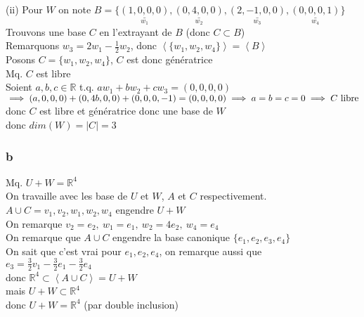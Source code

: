 \documentclass[11pt]{exam}
\newcommand{\R}{\mathbb{R}}
\newcommand{\0}{\mathbb{0}}
\begin{document}
(ii) Pour $W$ on note $B = \{\underset{w_1}{\underline{(1,0,0,0)}},\underset{w_2}{\underline{(0,4,0,0)}},\underset{w_3}{\underline{(2,-1,0,0)}},\underset{w_4}{\underline{(0,0,0,1)}}\}$\\
Trouvons une base $C$ en l'extrayant de $B$ (donc $C \subset B$)\\
Remarquons $w_3 = 2w_1-\frac{1}{2}w_2$, donc $\left<\{w_1, w_2, w_4\}\right> = \left<B\right>$\\
Posons $C = \{w_1, w_2, w_4\}$, $C$ est donc génératrice\\
Mq. $C$ est libre\\
Soient $a,b,c \in \R$ t.q. $aw_1 + bw_2 + cw_3 = (0,0,0,0)$\\
$\implies (a,0,0,0) + (0,4b,0,0) + (0,0,0,-1) = (0,0,0,0)\\\implies a = b = c = 0 \implies C\ \text{libre}$\\
donc $C$ est libre et génératrice donc une base de $W$\\
donc $dim(W) = |C| = 3$

\subsubsection*{b}
Mq. $U+W = \R^4$\\
On travaille avec les base de $U$ et $W$, $A$ et $C$ respectivement.\\
$A\cup C = {v_1,v_2,w_1,w_2,w_4}$ engendre $U+W$\\
On remarque $v_2 = e_2,\ w_1 = e_1,\ w_2 = 4e_2,\ w_4 = e_4$\\
On remarque que $A\cup C$ engendre la base canonique $\{e_1,e_2,e_3,e_4\}$\\
On sait que c'est vrai pour $e_1,e_2,e_4$, on remarque aussi que\\
$e_3 = \frac{3}{2}v_1-\frac{3}{2}e_1-\frac{3}{2}e_4$\\
donc $\R^4 \subset \left<A\cup C\right> = U+W$\\
mais $U+W \subset \R^4$\\
donc $U+W = \R^4$ (par double inclusion)
\end{document}
